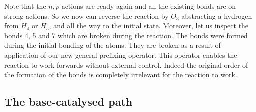 \noindent
Note that the $n,p$ actions are ready again and all the existing bonds are on strong actions. 
So we now can reverse the reaction by $O_3$ abstracting a hydrogen from $H_4$ or $H_5$, and 
all the way to the initial state.
Moreover, let us inspect the bonds 4, 5 and 7 which are broken during the reaction. The bonds were formed during the initial bonding of the atoms. They are broken as a
result of application of our new general prefixing operator. This operator enables the reaction 
to work forwards without external control. Indeed the original order of the formation of 
the bonds is completely irrelevant for the reaction to work.

\subsection{The base-catalysed path}

